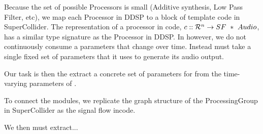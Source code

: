 \documentclass[12pt]{article}
\begin{document}
Because the set of possible Processors is small (Additive synthesis, Low Pass Filter, etc), we map each Processor in DDSP to a block of template code in SuperCollider.
The representation of a processor in code, $\codeProcessor :: \reals^n \to SF\ *\ Audio$, has a similar type signature as the Processor in DDSP.
In \codeProcessor however, we do not continuously consume a parameters that change over time.
Instead \codeProcessor must take a single fixed set of parameters that it uses to generate its audio output.

Our task is then the extract a concrete set of parameters for \codeProcessor from the time-varying parameters of \processor.

To connect the modules, we replicate the graph structure of the ProcessingGroup in SuperCollider as the signal flow incode.

We then must extract...





\end{document}
